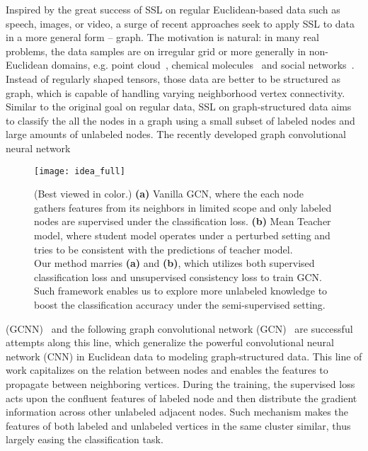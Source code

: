 \documentclass[letterpaper]{article} \usepackage{aaai19}  \usepackage{times}  \usepackage{helvet}  \usepackage{courier}  \usepackage{url}  \usepackage{graphicx}  \usepackage{algorithm}
\begin{document}
Inspired by the great success of SSL on regular Euclidean-based data such as speech, images, or video, a surge of recent approaches seek to apply SSL to data in a more general form -- graph. The motivation is natural: in many real problems, the data samples are on irregular grid or more generally in non-Euclidean domains, e.g. point cloud~\cite{wang2018dynamic}, chemical molecules~\cite{li2018adaptive}  and social networks~\cite{rahimi2018semi}. Instead of regularly shaped tensors, those data are better to be structured as graph, which is capable of handling varying neighborhood vertex connectivity. Similar to the original goal on regular data, SSL on graph-structured data aims to classify the all the nodes in a graph using a small subset of labeled nodes and large amounts of unlabeled nodes. The recently developed graph convolutional neural network 
\begin{figure}
\centering
\texttt{[image: idea\_full]}
\caption{(Best viewed in color.) \textbf{(a)} Vanilla GCN, where the each node gathers features from its neighbors in limited scope and only labeled nodes are supervised under the classification loss. \textbf{(b)} Mean Teacher model, where student model operates under a perturbed setting and tries to be consistent with the predictions of teacher model.\\
Our method marries \textbf{(a)} and \textbf{(b)}, which utilizes both supervised classification loss and unsupervised consistency loss to train GCN. Such framework enables us to explore more unlabeled knowledge to boost the classification accuracy under the semi-supervised setting.}
\end{figure}
(GCNN)~\cite{defferrard2016GCNN} and the following graph convolutional network (GCN)~\cite{kipf2016semi} are successful attempts along this line, which generalize the powerful convolutional neural network (CNN) in Euclidean data to modeling graph-structured data. This line of work capitalizes on the relation between nodes and enables the features to propagate between neighboring vertices. During the training, the supervised loss acts upon the confluent features of labeled node and then distribute the gradient information across other unlabeled adjacent nodes. Such mechanism makes the features of both labeled and unlabeled vertices in the same cluster similar, thus largely easing the classification task.  
\end{document}

